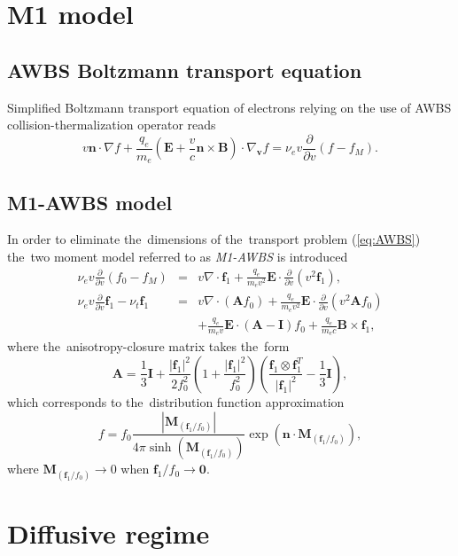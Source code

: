 \documentclass[review]{elsarticle}
\newcommand{\pdv}[2]{\frac{\partial{#1}}{\partial{#2}}}
\newcommand{\vect}[1]{\boldsymbol{#1}}
\newcommand{\matr}[1]{\mathbf{#1}}
\newcommand{\nue}{\nu_{e}}
\newcommand{\nutot}{\nu_{t}}
\newcommand{\vmag}{v}
\newcommand{\vn}{\vect{n}}
\newcommand{\E}{\vect{E}}
\newcommand{\B}{\vect{B}}
\newcommand{\qe}{q_e}
\newcommand{\me}{m_e}
\newcommand{\fM}{f_M}
\newcommand{\fzero}{f_0}
\newcommand{\fone}{\vect{f}_1}
\newcommand{\MI}{\matr{I}}
\newcommand{\MA}{\matr{A}}
\newcommand{\anisomega}{\fone/\fzero}
\newcommand{\acl}{\vect{M}_{\left(\anisomega\right)}}
\renewcommand{\refeq}[1]{(\ref{#1})}
\begin{document}
\section{M1 model}\label{sec:m1_model}
\subsection{AWBS Boltzmann transport equation}
Simplified Boltzmann transport equation of electrons relying on the use of AWBS
collision-thermalization operator \cite{AWBS_PRL1986} reads
\begin{equation}
  \vmag\vn\cdot\nabla f + \frac{\qe}{\me}\left( \E + 
  \frac{\vmag}{c}\vn\times\B\right)\cdot\nabla_{\vect{v}} f = \nue \vmag 
  \pdv{}{\vmag}\left( f - \fM\right) .
  \label{eq:AWBS}
\end{equation}
\subsection{M1-AWBS model}
In order to eliminate the~dimensions of the~transport problem \refeq{eq:AWBS}
the~two moment model referred to as \textit{M1-AWBS} is introduced
\begin{eqnarray}
  \nue\vmag\pdv{}{\vmag}\left(\fzero - \fM \right) &=&
  \vmag\nabla\cdot\fone + \frac{\qe}{\me\vmag^2}\E\cdot\pdv{}{\vmag}
  \left( \vmag^2 \fone\right) , 
  \label{eq:M1f0}\\
  \nue\vmag\pdv{}{\vmag}\fone - \nutot\fone &=& 
  \vmag\nabla\cdot\left(\MA\fzero\right) + 
  \frac{\qe}{\me\vmag^2}\E\cdot\pdv{}{\vmag}
  \left( \vmag^2 \MA\fzero\right) \nonumber\\
  && + \frac{\qe}{\me\vmag}\E\cdot\left( \MA - \MI \right)\fzero +
  \frac{\qe}{\me c}\B\times\fone ,
  \label{eq:M1f1}
\end{eqnarray}
where the~anisotropy-closure matrix takes the~form
\begin{equation}
  \MA = \frac{1}{3}\MI + \frac{|\fone|^2}{2\fzero^2}
  \left( 1 + \frac{|\fone|^2}{\fzero^2} \right)
  \left( \frac{\fone\otimes\fone^T}{|\fone|^2} - \frac{1}{3}\MI\right) ,
\end{equation}
which corresponds to the~distribution function approximation
\begin{equation}
  f = \fzero \frac{\left|\acl\right|}{4\pi\sinh\left(\acl\right)}
  \exp\left(\vn\cdot\acl\right) ,
\end{equation}
where $\acl \rightarrow 0$ when $\anisomega \rightarrow \vect{0}$. 

\section{Diffusive regime}
\end{document}

